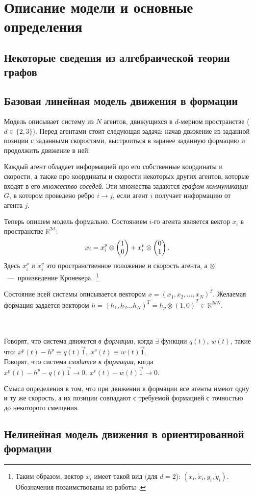 \chapter{Описание модели и основные определения} \label{definitions}

\section{Некоторые сведения из алгебраической теории графов}
\section{Базовая линейная модель движения в формации}
Модель описывает систему из $N$ агентов, движущихся в $d$-мерном пространстве ($d\in\{2,3\}$). Перед агентами стоит следующая задача: начав движение из заданной позиции с заданными скоростями, выстроиться в заранее заданную формацию и продолжить движение в ней. 

Каждый агент обладает информацией про его собственные координаты и скорости, а также про координаты и скорости некоторых других агентов, которые входят в его \emph{множество соседей}. Эти множества задаются \emph{графом коммуникации} $G$, в котором проведено ребро $i\rightarrow j$, если агент $i$ получает информацию от агента $j$.

Теперь опишем модель формально.
Состоянием $i$-го агента является  вектор $x_i$
в пространстве $\mathbb{R}^{2d}$:
$$x_i=x^p_i\otimes\veccol{1;0}+x^v_i\otimes
\veccol{0;1}.$$
Здесь $x^p_i$ и $x^v_i$ это пространственное положение и скорость агента, а $\otimes$\ ---\ произведение Кронекера.~\footnote{Таким образом, вектор $x_i$ имеет такой вид (для $d=2$): $\left(x_i, \dot{x}_i, y_i, \dot{y}_i\right)$. Обозначения позаимствованы из работы \cite{veerman2005flocks}.}

Состояние всей системы описывается вектором $x=\left(x_1,x_2,\ldots,x_N\right)^T$. Желаемая формация задается вектором 
$h={\left(h_1,h_2\ldots h_N\right)^T=h_p\otimes\left(1,0\right)}^T\in\mathbb{R}^{2dN}$.

\begin{definition}
\\\\
Говорят, что система движется \emph{в формации}, когда $\exists$ функции $q(t)$, $w(t)$, такие что:
$
x^p(t)-h^p\equiv q(t)\vec{1},\ x^v(t)\equiv w(t)\vec{1}.
$
\\
Говорят, что система \emph{сходится к формации}, когда
$
x^p(t)-h^p-q(t)\vec{1}\rightarrow 0,\ x^v(t)-w(t)\vec{1}\rightarrow 0.
$
\end{definition}

Смысл определения в том, что при движении в формации все агенты имеют одну и ту же скорость, а их позиции совпадают с требуемой формацией с точностью до некоторого смещения.



\section{Нелинейная модель движения в ориентированной формации}

\clearpage
